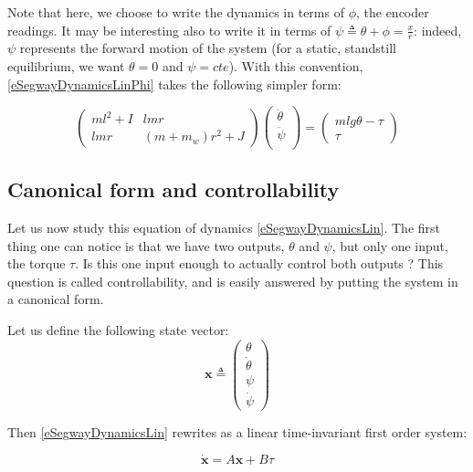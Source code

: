 \documentclass[a4paper,11pt]{article}
\begin{document}
Note that here, we choose to write the dynamics in terms of $\phi$, the encoder readings. It may be interesting also to write it in terms of $\psi \triangleq \theta + \phi = \frac{x}{r}$: indeed, $\psi$ represents the forward motion of the system (for a static, standstill equilibrium, we want $\theta  = 0$ and $\psi = cte$). With this convention, \eqref{eSegwayDynamicsLinPhi} takes the following simpler form:

\begin{equation}
\begin{pmatrix}
m l^{2}  +  I  & l m r   \\
l m r  & {\left(m + {m_w}\right)} r^{2} + J
\end{pmatrix}
\begin{pmatrix}
\ddot{\theta} \\
\ddot{\psi} \\
\end{pmatrix}
=
\begin{pmatrix}
m l g \theta - \tau \\
\tau
\end{pmatrix}
\label{eSegwayDynamicsLin}
\end{equation}

\subsection{Canonical form and controllability}

Let us now study this equation of dynamics \eqref{eSegwayDynamicsLin}. The first thing one can notice is that we have two outputs, $\theta$ and $\psi$, but only one input, the torque $\tau$. Is this one input enough to actually control both outputs ? This question is called controllability, and is easily answered by putting the system in a canonical form.

Let us define the following state vector:
\begin{equation}
	\bm x \triangleq \begin{pmatrix} \theta \\ \dot{\theta} \\ \psi \\ \dot{\psi} \end{pmatrix} 
\end{equation}

Then \eqref{eSegwayDynamicsLin} rewrites as a linear time-invariant first order system:

\begin{equation}
	\dot{\bm x} = A \bm x + B \tau
\end{equation}
\end{document}
